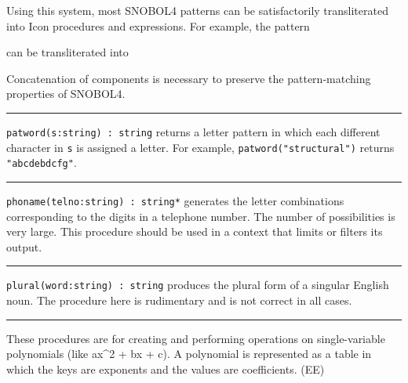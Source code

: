 Using this system, most SNOBOL4 patterns can be satisfactorily
transliterated into Icon procedures and expressions. For example, the
pattern


can be transliterated into


Concatenation of components is necessary to preserve the
pattern-matching properties of SNOBOL4. 

\vspace{0.25cm}\hrule{}

\texttt{patword(s:string) : string} returns a letter pattern in which
each different character in \texttt{s} is assigned a letter. For
example, \texttt{patword("structural")}
returns \texttt{"abcdebdcfg"}.

\vspace{0.25cm}\hrule{}

\texttt{phoname(telno:string) : string*} generates the letter
combinations corresponding to the digits in a telephone number. The
number of possibilities is very large. This procedure should be used in
a context that limits or filters its output.

\vspace{0.25cm}\hrule{}

\texttt{plural(word:string) : string} produces the plural form of a singular English noun. The procedure here is
rudimentary and is not correct in all cases. 

\vspace{0.25cm}\hrule{}

These procedures are for creating and performing operations on
single-variable polynomials (like ax\^{}2 + bx + c).
A polynomial is represented as a table in which the keys are exponents
and the values are coefficients. (EE)

